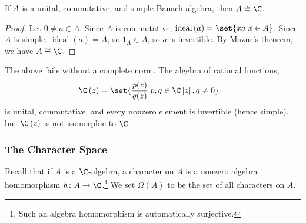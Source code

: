 \documentclass[10pt]{mypackage}
\begin{document}
\begin{corollary}
  If $A$ is a unital, commutative, and simple Banach algebra, then $A\cong \C$.
\end{corollary}
\begin{proof}
  Let $0\neq a\in A$. Since $A$ is commutative, $\operatorname{ideal}\left(a\right) = \set{xa | x\in A}$. Since $A$ is simple, $\operatorname{ideal}\left(a\right) = A$, so $1_A \in A$, so $a$ is invertible. By Mazur's theorem, we have $A\cong \C$.
\end{proof}
\begin{remark}
  The above fails without a complete norm. The algebra of rational functions,
  \begin{align*}
    \C\left(z\right) &= \set{\frac{p(z)}{q(z)} | p,q\in \C\left[z\right],q\neq 0}
  \end{align*}
  is unital, commutative, and every nonzero element is invertible (hence simple), but $\C\left(z\right)$ is not isomorphic to $\C$.
\end{remark}
\subsubsection{The Character Space}%
Recall that if $A$ is a $\C$-algebra, a character on $A$ is a nonzero algebra homomorphism $h\colon A\rightarrow \C$.\footnote{Such an algebra homomorphism is automatically surjective.} We set $\Omega\left(A\right)$ to be the set of all characters on $A$.\newline
\end{document}
